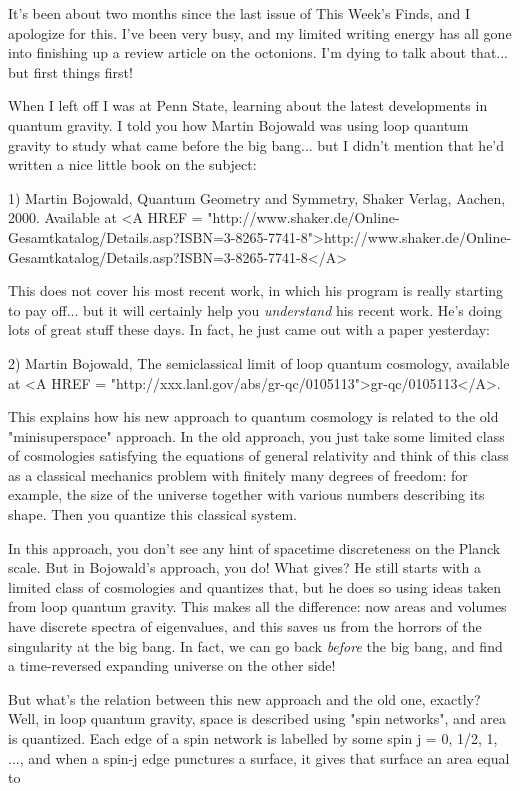 

It's been about two months since the last issue of This Week's Finds,
and I apologize for this.  I've been very busy, and my limited writing
energy has all gone into finishing up a review article on the octonions.
I'm dying to talk about that... but first things first!

When I left off I was at Penn State, learning about the latest
developments in quantum gravity.  I told you how Martin Bojowald was
using loop quantum gravity to study what came before the big bang... 
but I didn't mention that he'd written a nice little book on the subject:

1) Martin Bojowald, Quantum Geometry and Symmetry, Shaker Verlag,
Aachen, 2000.  Available at 
<A HREF = "http://www.shaker.de/Online-Gesamtkatalog/Details.asp?ISBN=3-8265-7741-8">http://www.shaker.de/Online-Gesamtkatalog/Details.asp?ISBN=3-8265-7741-8</A>

This does not cover his most recent work, in which his program is really
starting to pay off... but it will certainly help you \emph{understand} his
recent work.  He's doing lots of great stuff these days.  In fact, he
just came out with a paper yesterday:

2) Martin Bojowald, The semiclassical limit of loop quantum
cosmology, available at <A HREF = "http://xxx.lanl.gov/abs/gr-qc/0105113">gr-qc/0105113</A>.

This explains how his new approach to quantum cosmology is related to
the old "minisuperspace" approach.  In the old approach, you
just take some limited class of cosmologies satisfying the equations of
general relativity and think of this class as a classical mechanics
problem with finitely many degrees of freedom: for example, the size of
the universe together with various numbers describing its shape.  Then
you quantize this classical system.

In this approach, you don't see any hint of spacetime discreteness on
the Planck scale.  But in Bojowald's approach, you do!  What gives?  He
still starts with a limited class of cosmologies and quantizes that, but
he does so using ideas taken from loop quantum gravity.  This makes all
the difference: now areas and volumes have discrete spectra of
eigenvalues, and this saves us from the horrors of the singularity at
the big bang.  In fact, we can go back \emph{before} the big bang, 
and find a time-reversed expanding universe on the other side!

But what's the relation between this new approach and the old one,
exactly?  Well, in loop quantum gravity, space is described using "spin
networks", and area is quantized.  Each edge of a spin network is
labelled by some spin j = 0, 1/2, 1, ..., and when a spin-j edge
punctures a surface, it gives that surface an area equal to

